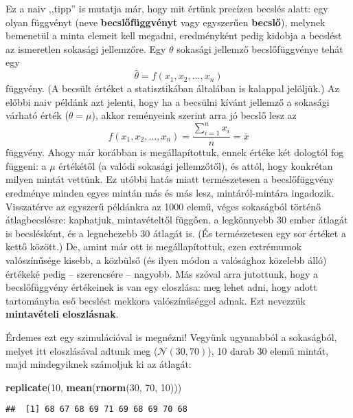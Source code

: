 \documentclass[]{book}
\newenvironment{Shaded}{\begin{snugshade}}{\end{snugshade}}
\newcommand{\KeywordTok}[1]{\textcolor[rgb]{0.13,0.29,0.53}{\textbf{#1}}}
\newcommand{\DecValTok}[1]{\textcolor[rgb]{0.00,0.00,0.81}{#1}}
\newcommand{\NormalTok}[1]{#1}
\begin{document}
Ez a naiv ,,tipp'' is mutatja már, hogy mit értünk precízen becslés
alatt: egy olyan függvényt (neve \textbf{becslőfüggvényt} vagy
egyszerűen \textbf{becslő}), melynek bemenetül a minta elemeit kell
megadni, eredményként pedig kidobja a becslést az ismeretlen sokasági
jellemzőre. Egy \(\theta\) sokasági jellemző becslőfüggvénye tehát egy
\[
    \widehat{\theta} = f\left(x_1,x_2,\ldots,x_n\right)
\] függvény. (A becsült értéket a statisztikában általában is kalappal
jelöljük.) Az előbbi naiv példánk azt jelenti, hogy ha a becsülni kívánt
jellemző a sokasági várható érték (\(\theta=\mu\)), akkor reményeink
szerint arra jó becslő lesz az \[
    f\left(x_1,x_2,\ldots,x_n\right)=\frac{\sum_{i=1}^n x_i}{n}=\overline{x}
\] függvény. Ahogy már korábban is megállapítottuk, ennek értéke két
dologtól fog függeni: a \(\mu\) értékétől (a valódi sokasági
jellemzőtől), és attól, hogy konkrétan milyen mintát vettünk. Ez utóbbi
hatás miatt természetesen a becslőfüggvény eredménye minden egyes mintán
más és más lesz, mintáról-mintára ingadozik. Visszatérve az egyszerű
példánkra az 1000 elemű, véges sokaságból történő átlagbecslésre:
kaphatjuk, mintavételtől függően, a legkönnyebb 30 ember átlagát is
becslésként, és a legnehezebb 30 átlagát is. (És természetesen egy sor
értéket a kettő között.) De, amint már ott is megállapítottuk, ezen
extrémumok valószínűsége kisebb, a közbülső (és ilyen módon a valósághoz
közelebb álló) értékeké pedig -- szerencsére -- nagyobb. Más szóval arra
jutottunk, hogy a becslőfüggvény értékeinek is van egy eloszlása: meg
lehet adni, hogy adott tartományba eső becslést mekkora valószínűséggel
adnak. Ezt nevezzük \textbf{mintavételi eloszlásnak}.

Érdemes ezt egy szimulációval is megnézni! Vegyünk ugyanabból a
sokaságból, melyet itt eloszlásával adtunk meg
(\(\mathcal{N}\left(30,70\right)\)), 10 darab 30 elemű mintát, majd
mindegyiknek számoljuk ki az átlagát:

\begin{Shaded}
\begin{Highlighting}[]
\KeywordTok{replicate}\NormalTok{(}\DecValTok{10}\NormalTok{, }\KeywordTok{mean}\NormalTok{(}\KeywordTok{rnorm}\NormalTok{(}\DecValTok{30}\NormalTok{, }\DecValTok{70}\NormalTok{, }\DecValTok{10}\NormalTok{)))}
\end{Highlighting}
\end{Shaded}

\begin{verbatim}
##  [1] 68 67 68 69 71 69 68 69 70 68
\end{verbatim}
\end{document}
